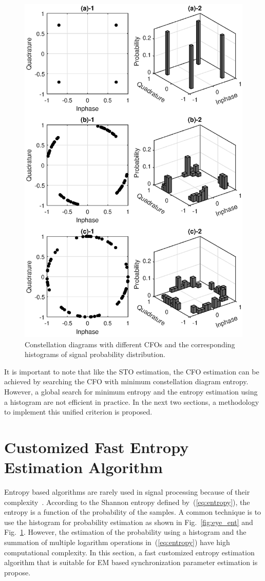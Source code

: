 \documentclass[12pt, draftclsnofoot, onecolumn]{IEEEtran}
\begin{document}
\begin{figure}[ht]
\centering
\includegraphics[width=3.5 in]{pic/const_hst-k.eps}
\caption{Constellation diagrams with different CFOs and the corresponding histograms of signal probability distribution.}
\label{fig:const_hst} 
\end{figure}

It is important to note that like the STO estimation, the CFO estimation can be achieved by searching the CFO with minimum constellation diagram entropy.
However, a global search for minimum entropy and the entropy estimation using a histogram are not efficient in practice.
In the next two sections, a methodology to implement this unified criterion is proposed.

\section{Customized Fast Entropy Estimation Algorithm}
\label{sec:cust_entp}
Entropy based algorithms are rarely used in signal processing because of their complexity~\cite{Bercher2000}.
According to the Shannon entropy defined by~(\ref{eq:entropy}), the entropy is a function of the probability of the samples.
A common technique is to use the histogram for probability estimation as shown in Fig.~\ref{fig:eye_ent} and Fig.~\ref{fig:const_hst}.
However, the estimation of the probability using a histogram and the summation of multiple logarithm operations  in~(\ref{eq:entropy}) have high computational complexity.
In this section, a fast customized entropy estimation algorithm that is suitable for EM based synchronization parameter estimation is propose. 
\end{document}
